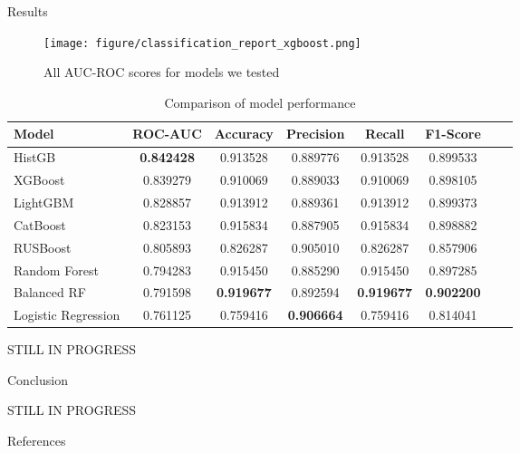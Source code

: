 \documentclass[final]{beamer}
\newlength{\sepwidth}
\newlength{\colwidth}
\newcommand{\separatorcolumn}{\begin{column}{\sepwidth}\end{column}}
\begin{document}
\begin{frame}[t]
\begin{columns}[t]
\begin{column}{\colwidth}
  \begin{exampleblock}{Results}
\\
    \begin{center}
      \begin{figure}[H]
        \texttt{[image: figure/classification\_report\_xgboost.png]}
        \caption{All AUC-ROC scores for models we tested}
        \label{fig:accounts_df}
      \end{figure}
    \end{center}
    
    \begin{table}[H]
    \centering
    \begin{tabular}{|l|c|c|c|c|c|c|c|}
        \hline
        Model & ROC-AUC & Accuracy & Precision & Recall & F1-Score \\
        \hline

        HistGB & \textbf{0.842428} & 0.913528 & 0.889776 & 0.913528 & 0.899533 \\
        XGBoost & 0.839279 & 0.910069 & 0.889033 & 0.910069 & 0.898105 \\
        LightGBM & 0.828857 & 0.913912 & 0.889361 & 0.913912 & 0.899373 \\
        CatBoost & 0.823153 & 0.915834 & 0.887905 & 0.915834 & 0.898882 \\
        RUSBoost & 0.805893 & 0.826287 & 0.905010 & 0.826287 & 0.857906 \\
        Random Forest & 0.794283 & 0.915450 & 0.885290 & 0.915450 & 0.897285 \\
        Balanced RF & 0.791598 & \textbf{0.919677} & 0.892594 & \textbf{0.919677} & \textbf{0.902200} \\
        Logistic Regression & 0.761125 & 0.759416 & \textbf{0.906664} & 0.759416 & 0.814041 \\
        \hline
    \end{tabular}
    \caption{Comparison of model performance}
    \end{table}

    STILL IN PROGRESS

  \end{exampleblock}

  \begin{block}{Conclusion}

    STILL IN PROGRESS

  \end{block}

  \begin{block}{References}

    \nocite{*}

  \end{block}

\end{column}

\separatorcolumn
\end{columns}
\end{frame}
\end{document}
